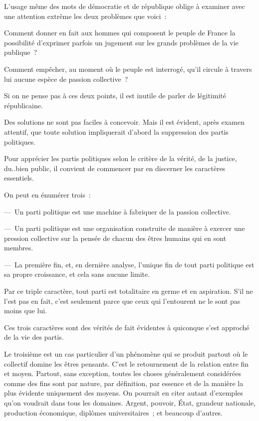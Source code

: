 \documentclass[french,twoside]{book} %
\begin{document}
L’usage même des mots de démocratie et de république oblige à examiner avec une attention extrême les deux problèmes que voici :\par
Comment donner en fait aux hommes qui composent le peuple de France la possibilité d’exprimer parfois un jugement sur les grands problèmes de la vie publique ?\par
Comment empêcher, au moment où le peuple est interrogé, qu’il circule à travers lui aucune espèce de passion collective ?\par
Si on ne pense pas à ces deux points, il est inutile de parler de légitimité républicaine.\par
Des solutions ne sont pas faciles à concevoir. Mais il est évident, après examen attentif, que toute solution impliquerait d’abord la suppression des partis politiques.\par
Pour apprécier les partis politiques selon le critère de la vérité, de la justice, du..bien public, il convient de commencer par en discerner les caractères essentiels.\par
On peut en énumérer trois :\par
— Un parti politique est une machine à fabriquer de la passion collective.\par
— Un parti politique est une organisation construite de manière à exercer une pression collective sur la pensée de chacun des êtres humains qui en sont membres.\par
— La première fin, et, en dernière analyse, l’unique fin de tout parti politique est sa propre croissance, et cela sans aucune limite.\par
Par ce triple caractère, tout parti est totalitaire en germe et en aspiration. S’il ne l’est pas en fait, c’est seulement parce que ceux qui l’entourent ne le sont pas moins que lui.\par
Ces trois caractères sont des vérités de fait évidentes à quiconque s’est approché de la vie des partis.\par
Le troisième est un cas particulier d’un phénomène qui se produit partout où le collectif domine les êtres pensants. C’est le retournement de la relation entre fin et moyen. Partout, sans exception, toutes les choses généralement considérées comme des fins sont par nature, par définition, par essence et de la manière la plus évidente uniquement des moyens. On pourrait en citer autant d’exemples qu’on voudrait dans tous les domaines. Argent, pouvoir, État, grandeur nationale, production économique, diplômes universitaires ; et beaucoup d’autres.\par
\end{document}
